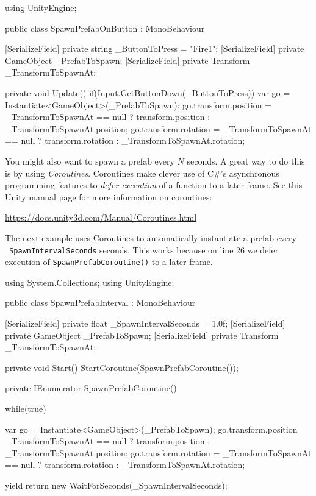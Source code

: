 \documentclass[11pt]{article}
\def\StartLineAt#1{\lstset{firstnumber=#1}}
\begin{document}
\StartLineAt{1}
\begin{csharp}
using UnityEngine;

public class SpawnPrefabOnButton : MonoBehaviour
{
    [SerializeField]
    private string _ButtonToPress = "Fire1";
    [SerializeField]
    private GameObject _PrefabToSpawn;
    [SerializeField]
    private Transform _TransformToSpawnAt;

    private void Update()
    {
        if(Input.GetButtonDown(_ButtonToPress))
        {
            var go = Instantiate<GameObject>(_PrefabToSpawn);
            go.transform.position = _TransformToSpawnAt == null ? transform.position : _TransformToSpawnAt.position;
            go.transform.rotation = _TransformToSpawnAt == null ? transform.rotation : _TransformToSpawnAt.rotation;
        }
    }
}
\end{csharp}

You might also want to spawn a prefab every $N$ seconds.  A great way to do this is by using
\textit{Coroutines}.  Coroutines make clever use of C\#'s asynchronous programming features to
\textit{defer execution} of a function to a later frame.  See this Unity manual page for more
information on coroutines:

\begin{center}
\href{https://docs.unity3d.com/Manual/Coroutines.html}{https://docs.unity3d.com/Manual/Coroutines.html}
\end{center}

The next example uses Coroutines to automatically instantiate a prefab every 
\lstinline|_SpawnIntervalSeconds| seconds.  This works because on line 26 we defer execution of
\lstinline|SpawnPrefabCoroutine()| to a later frame.

\StartLineAt{1}
\begin{csharp}
using System.Collections;
using UnityEngine;

public class SpawnPrefabInterval : MonoBehaviour
{
    [SerializeField]
    private float _SpawnIntervalSeconds = 1.0f;
    [SerializeField]
    private GameObject _PrefabToSpawn;
    [SerializeField]
    private Transform _TransformToSpawnAt;

    private void Start()
    {
        StartCoroutine(SpawnPrefabCoroutine());
    }

    private IEnumerator SpawnPrefabCoroutine()
    {
        while(true)
        {
            var go = Instantiate<GameObject>(_PrefabToSpawn);
            go.transform.position = _TransformToSpawnAt == null ? transform.position : _TransformToSpawnAt.position;
            go.transform.rotation = _TransformToSpawnAt == null ? transform.rotation : _TransformToSpawnAt.rotation;

            yield return new WaitForSeconds(_SpawnIntervalSeconds);
        }
    }
}
\end{csharp}
\end{document}
